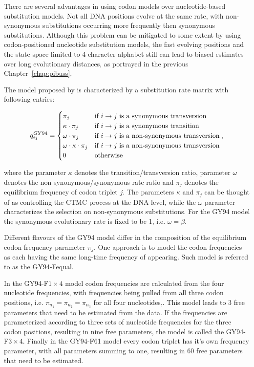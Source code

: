 There are several advantages in using codon models over nucleotide-based substitution models.
Not all DNA positions evolve at the same rate, with non-synonymous substitutions occurring more frequently then synonymous substitutions.
Although this problem can be mitigated to some extent by using codon-positioned nucleotide substitution models, the fast evolving positions and the state space limited to 4 character alphabet still can lead to biased estimates over long evolutionary distances, as portrayed in the previous Chapter~\ref{chap:pibuss}.

The model proposed by \cite{Goldman1994} is characterized by a substitution rate matrix with following entries:

\footnotesize{
\begin{equation}
q_{ij}^{GY94}=\begin{cases}
\pi_{j} & \text{if \ensuremath{i\rightarrow j} is a synonymous transversion}\\
\kappa\cdot\pi_{j} & \text{if \ensuremath{i\rightarrow j} is a synonymous transition}\\
\omega\cdot\pi_{j} & \text{if \ensuremath{i\rightarrow j} is a non-synonymous transversion}\\
\omega\cdot\kappa\cdot\pi_{j} & \text{if \ensuremath{i\rightarrow j} is a non-synonymous transversion}\\
0 & \text{otherwise}
\end{cases},
\label{eq:gy94}
\end{equation}
} %

\noindent
where the parameter $\kappa$ denotes the transition/transversion ratio, parameter $\omega$ denotes the non-synonymous/synonymous
rate ratio and $\pi_j$ denotes the equilibrium frequency of codon triplet $j$.
The parameters $\kappa$ and $\pi_j$ can be thought of as controlling the CTMC process at the DNA level, while the $\omega$ parameter characterizes the selection on non-synonymous substitutions.
For the GY94 model the synonymous evolutionary rate is fixed to be 1, i.e. $\omega=\beta$.

Different flavours of the GY94 model differ in the composition of the equilibrium codon frequency parameter $\pi_{j}$.
One approach is to model the codon frequencies as each having the same long-time frequency of appearing. 
Such model is referred to as the GY94-Fequal.

In the GY94-F$1\times4$ model codon frequencies are calculated from the four nucleotide frequencies, with frequencies being pulled from all three codon positions, i.e. $\pi_{n_{1}}=\pi_{n_{2}}=\pi_{n_{3}}$ for all four nucleotides,.
This model leads to 3 free parameters that need to be estimated from the data. 
If the frequencies are parameterized according to three sets of nucleotide frequencies for the three codon positions, resulting in nine free parameters, the model is called the GY94-F$3\times4$.
Finally in the GY94-F61 model every codon triplet has it's own frequency parameter, with all parameters summing to one, resulting in 60 free parameters that need to be estimated.

